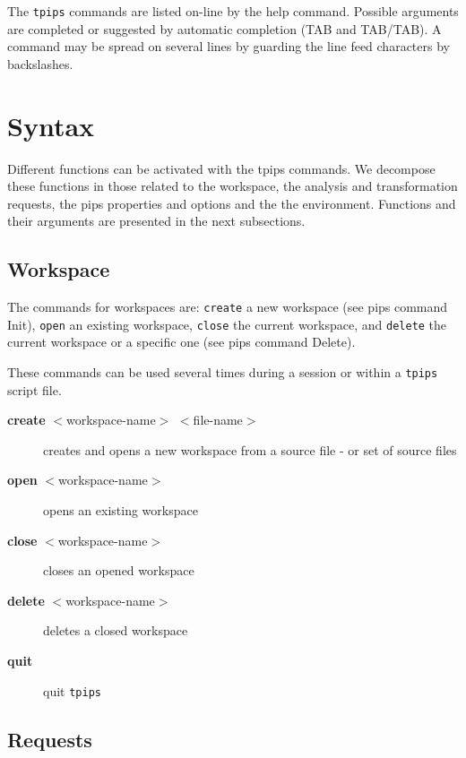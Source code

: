 \documentclass[a4paper,12pt]{article}
\begin{document}
The {\tt tpips} commands are listed on-line by the help command.
Possible arguments are completed or suggested by automatic
completion (TAB and TAB/TAB). A command may be spread on
several lines by guarding the line feed characters by
backslashes.


\section{Syntax}

Different functions can be activated with the tpips commands. We decompose
these functions in those related to the workspace, the analysis and
transformation requests, the pips properties and options and the the environment. 
Functions  and their arguments are presented in the next subsections. 


\subsection{Workspace} 
The commands for workspaces are: {\tt create} a new workspace (see
pips command Init), {\tt open} an existing workspace, {\tt close} the
current workspace, and {\tt delete} the current workspace or a
specific one (see pips command Delete).

These commands can be used several times during a session or
within a {\tt tpips} script file.

\begin{description}
  
\item [{\bf create} $<$workspace-name$>$ $<$file-name$>$] creates and
  opens a new workspace from a source file - or set of source files
  
\item [ {\bf open} $<$workspace-name$>$] opens an existing workspace
 
\item [ {\bf close} $<$workspace-name$>$] closes an opened workspace

  
\item [ {\bf delete} $<$workspace-name$>$] deletes a closed workspace
  
\item [ {\bf quit}] quit {\tt tpips}

\end{description}


\subsection{Requests} 
\end{document}
